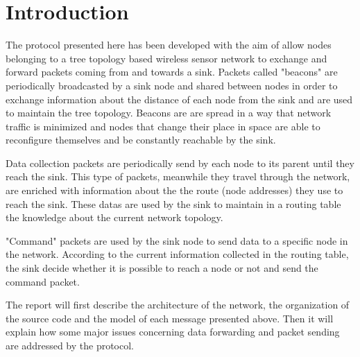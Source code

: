 \section{Introduction}
\label{sec:introduction}

The protocol presented here has been developed with the aim of allow nodes belonging to a tree topology based wireless sensor network to exchange and forward packets coming from and towards a sink. Packets called "beacons" are periodically broadcasted by a sink node and shared between nodes in order to exchange information about the distance of each node from the sink and are used to maintain the tree topology. Beacons are are spread in a way that network traffic is minimized and nodes that change their place in space are able to reconfigure themselves and be constantly reachable by the sink.

Data collection packets are periodically send by each node to its parent until they reach the sink. 
This type of packets, meanwhile they travel through the network, are enriched with information about the the route (node addresses) they use to reach the sink. These datas are used by the sink to maintain in a routing table the knowledge about the current network topology.

"Command" packets are used by the sink node to send data to a specific node in the network. According to the current information collected in the routing table, the sink decide whether it is possible to reach a node or not and send the command packet.

The report will first describe the architecture of the network, the organization of the source code and the model of each message presented above.
Then it will explain how some major issues concerning data forwarding and packet sending are addressed by the protocol.
